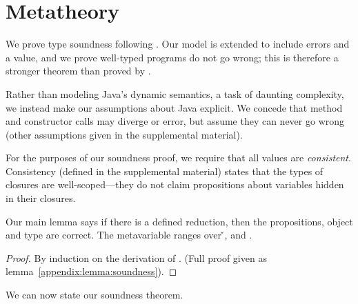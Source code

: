 \section{Metatheory}
\label{sec:metatheory}

We prove type soundness following \cite{TF10}.  Our model is extended
to include errors and a \wrong{} value, and we prove well-typed
programs do not go wrong; this is therefore a stronger theorem than
proved by \cite{TF10}.

Rather than modeling Java's dynamic semantics, a task of daunting
complexity, we instead make our assumptions about Java explicit. We
concede that method and constructor calls may diverge or error, but
assume they can never go wrong
(other assumptions
given in the supplemental material).

{}





For the purposes of our soundness proof, we require that all values
are \emph{consistent}.  Consistency (defined in the supplemental
material) states that the types of closures are well-scoped---they do
not claim propositions about variables hidden in their closures.


Our main lemma says if there is a defined reduction, then the propositions, object
and type are correct.
The metavariable  ranges over \v{}, \errorvalv{} and \wrong{}.

\begin{lemma}\label{main:lemma:soundness}

  {\soundnesslemmahypothesis}
  \begin{proof}
    By induction on the derivation of \opsem {\openv{}} {\e{}} {\a{}}.
    (Full proof given as lemma~\ref{appendix:lemma:soundness}).
  \end{proof}
\end{lemma}


We can now state our soundness theorem.

{}

%
